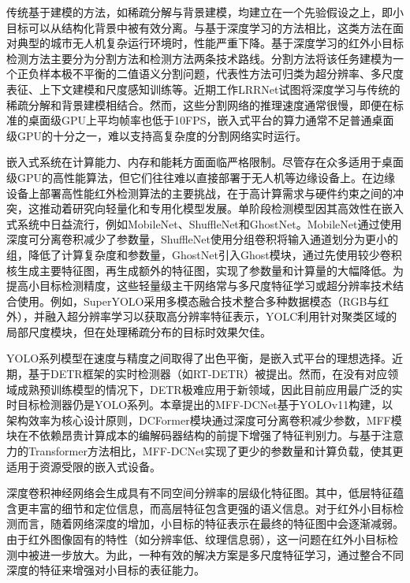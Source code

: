 传统基于建模的方法，如稀疏分解与背景建模，均建立在一个先验假设之上，即小目标可以从结构化背景中被有效分离。与基于深度学习的方法相比，这类方法在面对典型的城市无人机复杂运行环境时，性能严重下降。基于深度学习的红外小目标检测方法主要分为分割方法和检测方法两条技术路线。分割方法\cite{Kou2023survey}将该任务建模为一个正负样本极不平衡的二值语义分割问题，代表性方法可归类为超分辨率、多尺度表征、上下文建模和尺度感知训练等。近期工作LRRNet\cite{Zhang2025LRRNet}试图将深度学习与传统的稀疏分解和背景建模相结合。然而，这些分割网络的推理速度通常很慢\cite{Dai2021ALCNet}，即便在标准的桌面级GPU上平均帧率也低于10FPS，嵌入式平台的算力通常不足普通桌面级GPU的十分之一，难以支持高复杂度的分割网络实时运行。

嵌入式系统在计算能力、内存和能耗方面面临严格限制。尽管存在众多适用于桌面级GPU的高性能算法，但它们往往难以直接部署于无人机等边缘设备上。在边缘设备上部署高性能红外检测算法的主要挑战，在于高计算需求与硬件约束之间的冲突\cite{Min2024LWUAVDet}，这推动着研究向轻量化和专用化模型发展。单阶段检测模型因其高效性在嵌入式系统中日益流行，例如MobileNet\cite{Andrew2017MobileNets}、ShuffleNet\cite{Zhang2018ShuffleNet}和GhostNet\cite{Han2020GhostNet}。MobileNet通过使用深度可分离卷积减少了参数量，ShuffleNet使用分组卷积将输入通道划分为更小的组，降低了计算复杂度和参数量，GhostNet引入Ghost模块，通过先使用较少卷积核生成主要特征图，再生成额外的特征图，实现了参数量和计算量的大幅降低。为提高小目标检测精度，这些轻量级主干网络常与多尺度特征学习\cite{FPN,He2015SPP}或超分辨率技术结合使用。例如，SuperYOLO\cite{Zhang2023SuperYOLO}采用多模态融合技术整合多种数据模态（RGB与红外），并融入超分辨率学习以获取高分辨率特征表示，YOLC\cite{Liu2024YOLC}利用针对聚类区域的局部尺度模块，但在处理稀疏分布的目标时效果欠佳。

YOLO系列模型在速度与精度之间取得了出色平衡，是嵌入式平台的理想选择\cite{Xiong2024}。近期，基于DETR\cite{Carion2020DETR}框架的实时检测器（如RT-DETR\cite{Zhao202RTDETR}）被提出。然而，在没有对应领域成熟预训练模型的情况下，DETR极难应用于新领域，因此目前应用最广泛的实时目标检测器仍是YOLO系列。本章提出的MFF-DCNet基于YOLOv11构建，以架构效率为核心设计原则，DCFormer模块通过深度可分离卷积减少参数，MFF模块在不依赖昂贵计算成本的编解码器结构的前提下增强了特征判别力。与基于注意力的Transformer方法相比，MFF-DCNet实现了更少的参数量和计算负载，使其更适用于资源受限的嵌入式设备。

深度卷积神经网络会生成具有不同空间分辨率的层级化特征图。其中，低层特征蕴含更丰富的细节和定位信息，而高层特征包含更强的语义信息。对于红外小目标检测而言，随着网络深度的增加，小目标的特征表示在最终的特征图中会逐渐减弱。由于红外图像固有的特性（如分辨率低、纹理信息弱），这一问题在红外小目标检测中被进一步放大。为此，一种有效的解决方案是多尺度特征学习，通过整合不同深度的特征来增强对小目标的表征能力。

